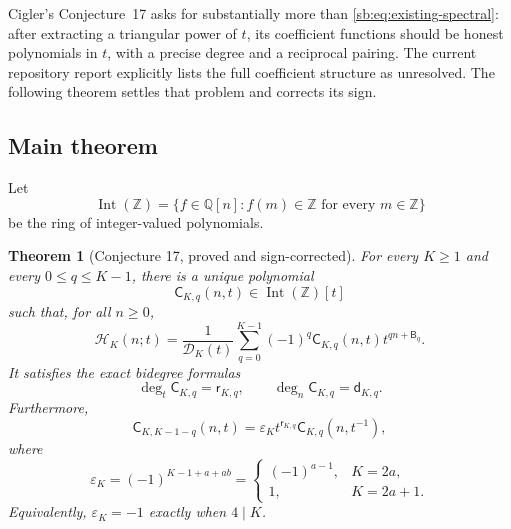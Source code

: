 \documentclass[11pt]{article}
\newtheorem{theorem}{Theorem}[section]
\theoremstyle{definition}
\theoremstyle{remark}
\newcommand{\Z}{\mathbb Z}
\newcommand{\Q}{\mathbb Q}
\newcommand{\Ht}{\mathcal H}
\newcommand{\IntZ}{\operatorname{Int}(\Z)}
\newcommand{\Den}{\mathcal D}
\newcommand{\Cblock}{\mathsf C}
\newcommand{\Btri}{\mathsf B}
\newcommand{\dq}{\mathsf d}
\newcommand{\rdeg}{\mathsf r}
\newcommand{\epsK}{\varepsilon}
\theoremstyle{definition}
\theoremstyle{plain}
\numberwithin{equation}{section}
\begin{document}
Cigler's Conjecture~17 asks for substantially more than
\eqref{sb:eq:existing-spectral}: after extracting a triangular power of $t$, its
coefficient functions should be honest polynomials in $t$, with a precise
degree and a reciprocal pairing.  The current repository report explicitly
lists the full coefficient structure as unresolved.  The following theorem
settles that problem and corrects its sign.


\subsection{Main theorem}
Let
\begin{equation}
 \IntZ=\{f\in\Q[n]: f(m)\in\Z\text{ for every }m\in\Z\}
 \label{sb:eq:IntZ}
\end{equation}
be the ring of integer-valued polynomials.

\begin{theorem}[Conjecture 17, proved and sign-corrected]
\label{sb:thm:main}
For every $K\ge1$ and every $0\le q\le K-1$, there is a unique polynomial
\[
 \Cblock_{K,q}(n,t)\in\IntZ[t]
\]
such that, for all $n\ge0$,
\begin{equation}
 \boxed{\displaystyle
 \Ht_K(n;t)=\frac{1}{\Den_K(t)}
 \sum_{q=0}^{K-1}(-1)^q
 \Cblock_{K,q}(n,t)t^{qn+\Btri_q}.}
 \label{sb:eq:main-expansion}
\end{equation}
It satisfies the exact bidegree formulas
\begin{equation}
 \boxed{\deg_t\Cblock_{K,q}=\rdeg_{K,q},
 \qquad \deg_n\Cblock_{K,q}=\dq_{K,q}.}
 \label{sb:eq:bidegrees}
\end{equation}
Furthermore,
\begin{equation}
 \boxed{\displaystyle
 \Cblock_{K,K-1-q}(n,t)=\epsK_K
 t^{\rdeg_{K,q}}\Cblock_{K,q}(n,t^{-1}),}
 \label{sb:eq:corrected-reciprocity}
\end{equation}
where
\begin{equation}
 \epsK_K=(-1)^{K-1+a+ab}
 =\begin{cases}
   (-1)^{a-1},&K=2a,\\
   1,&K=2a+1.
  \end{cases}
 \label{sb:eq:epsilon}
\end{equation}
Equivalently, $\epsK_K=-1$ exactly when $4\mid K$.
\end{theorem}
\end{document}
